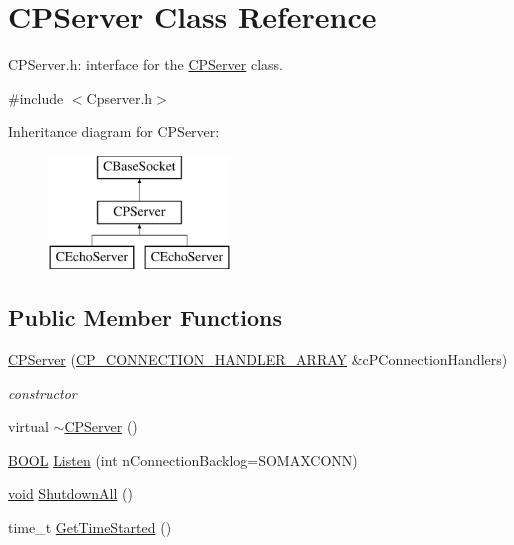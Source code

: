 \hypertarget{class_c_p_server}{\section{\-C\-P\-Server \-Class \-Reference}
\label{class_c_p_server}
}


\-C\-P\-Server.\-h\-: interface for the \hyperlink{class_c_p_server}{\-C\-P\-Server} class.  




{\ttfamily \#include $<$\-Cpserver.\-h$>$}

\-Inheritance diagram for \-C\-P\-Server\-:\begin{figure}[H]
\begin{center}
\leavevmode
\includegraphics[height=3.000000cm]{class_c_p_server}
\end{center}
\end{figure}
\subsection*{\-Public \-Member \-Functions}
\begin{DoxyCompactItemize}
\item 
\hyperlink{class_c_p_server_a5adf5787e2cfb4ecfe86a0c18f2e1cb3}{\-C\-P\-Server} (\hyperlink{_c_p_connection_handler_8h_a05bf2fef946dbf14350a5f45bb28f953}{\-C\-P\-\_\-\-C\-O\-N\-N\-E\-C\-T\-I\-O\-N\-\_\-\-H\-A\-N\-D\-L\-E\-R\-\_\-\-A\-R\-R\-A\-Y} \&c\-P\-Connection\-Handlers)
\begin{DoxyCompactList}\small\item\em constructor \end{DoxyCompactList}\item 
virtual \hyperlink{class_c_p_server_a5698810878ce141158b4a9bf9dfeb4bf}{$\sim$\-C\-P\-Server} ()
\item 
\hyperlink{_cpclient_8h_a3be13892ae7076009afcf121347dd319}{\-B\-O\-O\-L} \hyperlink{class_c_p_server_a507f35f780de641c071bfd8a3f793a75}{\-Listen} (int n\-Connection\-Backlog=\-S\-O\-M\-A\-X\-C\-O\-N\-N)
\item 
\hyperlink{_cpclient_8h_a6464f7480a0fd0ee170cba12b2c0497f}{void} \hyperlink{class_c_p_server_ac7ed83bcdae44d824e4391861290b565}{\-Shutdown\-All} ()
\item 
time\-\_\-t \hyperlink{class_c_p_server_aa4a8f5591c3f63de66deff1d6b4a1c5e}{\-Get\-Time\-Started} ()
\end{DoxyCompactItemize}

